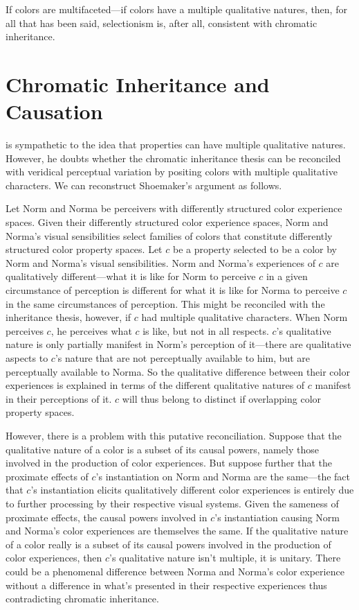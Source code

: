 \documentclass[12pt]{article}
\begin{document}
If colors are multifaceted---if colors have a multiple qualitative natures, then, for all that has been said, selectionism is, after all, consistent with chromatic inheritance.


\section{Chromatic Inheritance and Causation}\label{sec:inhertance_and_chromatic_causation}

\citet[269]{Shoemaker:2006vn} is sympathetic to the idea that properties can have multiple qualitative natures. However, he doubts whether the chromatic inheritance thesis can be reconciled with veridical perceptual variation by positing colors with multiple qualitative characters. We can reconstruct Shoemaker's argument as follows.

Let Norm and Norma be perceivers with differently structured color experience spaces. Given their differently structured color experience spaces, Norm and Norma's visual sensibilities select families of colors that constitute differently structured color property spaces. Let \( c \) be a property selected to be a color by Norm and Norma's visual sensibilities. Norm and Norma's experiences of \( c \) are qualitatively different---what it is like for Norm to perceive \( c \) in a given circumstance of perception is different for what it is like for Norma to perceive \( c \) in the same circumstances of perception. This might be reconciled with the inheritance thesis, however, if \( c \) had multiple qualitative characters. When Norm perceives \( c \), he perceives what \( c \) is like, but not in all respects. \( c \)'s qualitative nature is only partially manifest in Norm's perception of it---there are qualitative aspects to \( c \)'s nature that are not perceptually available to him, but are perceptually available to Norma. So the qualitative difference between their color experiences is explained in terms of the different qualitative natures of \( c \) manifest in their perceptions of it. \( c \) will thus belong to distinct if overlapping color property spaces.

However, there is a problem with this putative reconciliation. Suppose that the qualitative nature of a color is a subset of its causal powers, namely those involved in the production of color experiences. But suppose further that the proximate effects of \( c \)'s instantiation on Norm and Norma are the same---the fact that \( c \)'s instantiation elicits qualitatively different color experiences is entirely due to further processing by their respective visual systems. Given the sameness of proximate effects, the causal powers involved in \( c \)'s instantiation causing Norm and Norma's color experiences are themselves the same. If the qualitative nature of a color really is a subset of its causal powers involved in the production of color experiences, then \( c \)'s qualitative nature isn't multiple, it is unitary. There could be a phenomenal difference between Norma and Norma's color experience without a difference in what's presented in their respective experiences thus contradicting chromatic inheritance.
\end{document}

